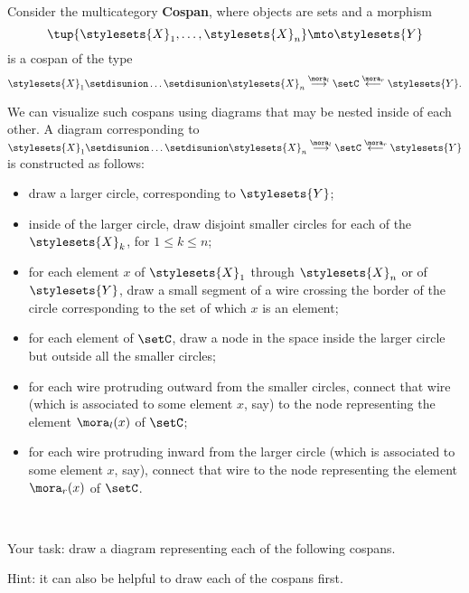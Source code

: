 \begin{gradedexercise}
    \label{ex:HwkCospanMulticat}
    
Consider the multicategory \textbf{Cospan}, where objects are sets and a morphism
\begin{equation}
\tup{\stylesets{X}_1, \dots, \stylesets{X}_n} \mto \stylesets{Y}
\end{equation}
is a cospan of the type
\begin{equation}
\stylesets{X}_1 \setdisunion  \dots \setdisunion  \stylesets{X}_n \overset{\mora_l}{\longrightarrow} \setC \overset{\mora_r}{\longleftarrow}  \stylesets{Y}.
\end{equation}

We can visualize such cospans using diagrams that may be nested inside of each other. A  diagram corresponding to $\stylesets{X}_1 \setdisunion  \dots \setdisunion  \stylesets{X}_n \overset{\mora_l}{\longrightarrow} \setC \overset{\mora_r}{\longleftarrow}  \stylesets{Y}$ is constructed as follows: 
\begin{itemize}
\item draw a larger circle, corresponding to  $\stylesets{Y}$;
\item inside of the larger circle, draw disjoint smaller circles for each of the $\stylesets{X}_k$, for $1 \leq k \leq n$; 
\item for each element $x$ of $\stylesets{X}_1$ through $\stylesets{X}_n$ or of $\stylesets{Y}$, draw a small segment of a wire crossing the border of the circle corresponding to the set of which $x$ is an element;
\item for each element of $\setC$, draw a node in the space inside the larger circle but outside all the smaller circles; 
\item for each wire protruding outward from the smaller circles, connect that wire (which is associated to some element $x$, say) to the node representing the element $\mora_l(x)$ of $\setC$;
\item for each wire protruding inward from the larger circle (which is associated to some element $x$, say), connect that wire to the node representing the element $\mora_r(x)$ of $\setC$.
\end{itemize}

\

Your task: draw a diagram representing each of the following cospans.

Hint: it can also be helpful to draw each of the cospans first. 


\end{gradedexercise}
